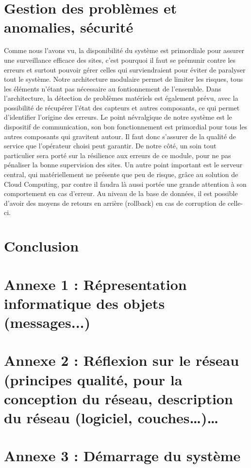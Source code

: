 \section{Gestion des problèmes et anomalies, sécurité}

Comme nous l'avons vu, la disponibilité du système est primordiale pour assurer une surveillance efficace des sites, c'est pourquoi il faut se prémunir contre les erreurs et surtout pouvoir gérer celles qui surviendraient pour éviter de paralyser tout le système. Notre architecture modulaire permet de limiter les risques, tous les éléments n'étant pas nécessaire au fontionnement de l'ensemble.
Dans l'architecture, la détection de problèmes matériels est également prévu, avec la possibilité de récupérer l'état des capteurs et autres composants, ce qui permet d'identifier l'origine des erreurs.
Le point névralgique de notre système est le dispositif de communication, son bon fonctionnement est primordial pour tous les autres composants qui gravitent autour. Il faut donc s'assurer de la qualité de service que l'opérateur choisi peut garantir. De notre côté, un soin tout particulier sera porté sur la résilience aux erreurs de ce module, pour ne pas pénaliser la bonne supervision des sites.
Un autre point important est le serveur central, qui matériellement ne présente que peu de risque, grâce au solution de Cloud Computing, par contre il faudra là aussi portée une grande attention à son comportement en cas d'erreur. Au niveau de la base de données, il est possible d'avoir des moyens de retours en arrière (rollback) en cas de corruption de celle-ci.

\section{Conclusion}

\newpage
\appendix
\appendixpage

\section{Annexe 1 : Répresentation informatique des objets (messages...)}

\section{Annexe 2 : Réflexion sur le réseau (principes qualité, pour la conception du réseau,
description du réseau (logiciel, couches…)…}


\section{Annexe 3 : Démarrage du système}

